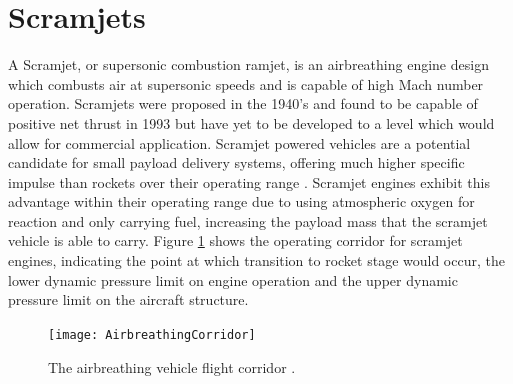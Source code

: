 \section{Scramjets}



A Scramjet, or supersonic combustion ramjet, is an airbreathing engine design which combusts air at supersonic speeds and is capable of high Mach number operation. Scramjets were proposed in the 1940's \cite{Curran2001} and found to be capable of positive net thrust in 1993 \cite{Paull1993} but have yet to be developed to a level which would allow for commercial application. Scramjet powered vehicles are a potential candidate for small payload delivery systems, offering much higher specific impulse than rockets over their operating range \cite{Billig1993} \cite{Cook2003}. Scramjet engines exhibit this advantage within their operating range due to using atmospheric oxygen for reaction and only carrying fuel, increasing the payload mass that the scramjet vehicle is able to carry. Figure \ref{fig:AirbreathingCorridor} shows the operating corridor for scramjet engines, indicating the point at which transition to rocket stage would occur, the lower dynamic pressure limit on engine operation and the upper dynamic pressure limit on the aircraft structure.
\begin{figure}[ht]
	\centering
	\texttt{[image: AirbreathingCorridor]}
	\caption{The airbreathing vehicle flight corridor \cite{Smart2010}.}
	\label{fig:AirbreathingCorridor}
\end{figure}

